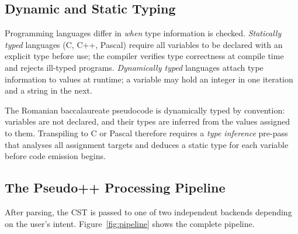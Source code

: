\subsection{Dynamic and Static Typing}

Programming languages differ in \textit{when} type information is checked.
\textit{Statically typed} languages (C, C++, Pascal) require all variables to
be declared with an explicit type before use; the compiler verifies type
correctness at compile time and rejects ill-typed programs.
\textit{Dynamically typed} languages attach type information to values at
runtime; a variable may hold an integer in one iteration and a string in the
next.

The Romanian baccalaureate pseudocode is dynamically typed by convention:
variables are not declared, and their types are inferred from the values
assigned to them.  Transpiling to C or Pascal therefore requires a
\textit{type inference} pre-pass that analyses all assignment targets and
deduces a static type for each variable before code emission begins.

\subsection{The Pseudo++ Processing Pipeline}
\label{subsec:pipeline}

After parsing, the CST is passed to one of two independent backends depending on
the user's intent.  Figure~\ref{fig:pipeline} shows the complete pipeline.

